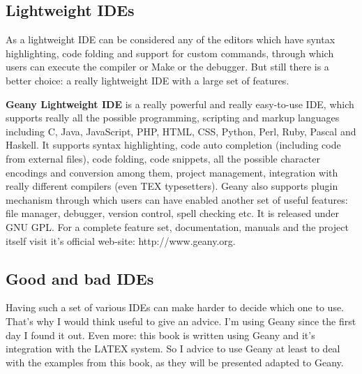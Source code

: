 \subsection{Lightweight IDEs}
As a lightweight IDE can be considered any of the editors which have syntax highlighting, code folding and support for custom commands, through which users can execute the compiler or Make or the debugger. But still there is a better choice: a really lightweight IDE with a large set of features. 

\textbf {Geany Lightweight IDE} is a really powerful and really easy-to-use IDE, which supports really all the possible programming, scripting and markup languages including C, Java, JavaScript, PHP, HTML, CSS, Python, Perl, Ruby, Pascal and Haskell. It supports syntax highlighting, code auto completion (including code from external files), code folding, code snippets, all the possible character encodings and conversion among them, project management, integration with really different compilers (even TEX typesetters). Geany also supports plugin mechanism through which users can have enabled another set of useful features: file manager, debugger, version control, spell checking etc. It is released under GNU GPL. For a complete feature set, documentation, manuals and the project itself visit it's official web-site: http://www.geany.org. 

\subsection{Good and bad IDEs}
Having such a set of various IDEs can make harder to decide which one to use. That's why I would think useful to give an advice. I'm using Geany since the first day I found it out. Even more: this book is written using Geany and it's integration with the LATEX system. So I advice to use Geany at least to deal with the examples from this book, as they will be presented adapted to Geany.


